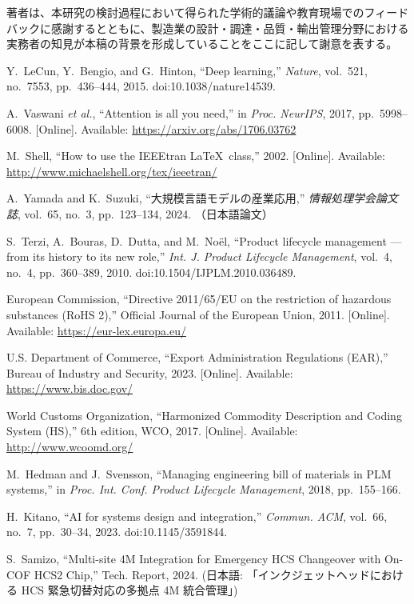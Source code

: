 \documentclass[10pt,conference]{IEEEtran}
\begin{document}
著者は、本研究の検討過程において得られた学術的議論や教育現場でのフィードバックに感謝するとともに、製造業の設計・調達・品質・輸出管理分野における実務者の知見が本稿の背景を形成していることをここに記して謝意を表する。

\begin{thebibliography}{00}

Y.~LeCun, Y.~Bengio, and G.~Hinton, ``Deep learning,'' \emph{Nature}, vol.~521,
no.~7553, pp.~436--444, 2015. doi:10.1038/nature14539.

A.~Vaswani \emph{et al.}, ``Attention is all you need,'' in \emph{Proc. NeurIPS},
2017, pp.~5998--6008. [Online]. Available: \url{https://arxiv.org/abs/1706.03762}

M.~Shell, ``How to use the {IEEEtran} \LaTeX\ class,'' 2002. [Online]. Available:
\url{http://www.michaelshell.org/tex/ieeetran/}

A.~Yamada and K.~Suzuki, ``大規模言語モデルの産業応用,'' \emph{情報処理学会論文誌}, vol.~65,
no.~3, pp.~123--134, 2024. （日本語論文）

S.~Terzi, A.~Bouras, D.~Dutta, and M.~Noël, ``Product lifecycle management — from its history to its new role,'' 
\emph{Int. J. Product Lifecycle Management}, vol.~4, no.~4, pp.~360--389, 2010. doi:10.1504/IJPLM.2010.036489.

European Commission, ``Directive 2011/65/EU on the restriction of hazardous substances (RoHS 2),'' 
Official Journal of the European Union, 2011. [Online]. Available: \url{https://eur-lex.europa.eu/}

U.S. Department of Commerce, ``Export Administration Regulations (EAR),'' 
Bureau of Industry and Security, 2023. [Online]. Available: \url{https://www.bis.doc.gov/}

World Customs Organization, ``Harmonized Commodity Description and Coding System (HS),'' 
6th edition, WCO, 2017. [Online]. Available: \url{http://www.wcoomd.org/}

M.~Hedman and J.~Svensson, ``Managing engineering bill of materials in PLM systems,'' 
in \emph{Proc. Int. Conf. Product Lifecycle Management}, 2018, pp.~155--166.

H.~Kitano, ``AI for systems design and integration,'' \emph{Commun. ACM}, vol.~66, no.~7, pp.~30--34, 2023. doi:10.1145/3591844.

S.~Samizo, ``Multi-site 4M Integration for Emergency HCS Changeover
with On-COF HCS2 Chip,'' Tech. Report, 2024. (日本語: 「インクジェットヘッドにおける HCS 緊急切替対応の多拠点 4M 統合管理」)

\end{thebibliography}
\end{document}
